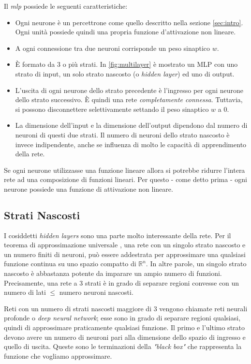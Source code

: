 Il \emph{mlp} possiede le seguenti caratteristiche: 
\begin{itemize}
\item Ogni neurone è un percettrone come quello descritto nella sezione \ref{sec:intro}. Ogni unità possiede quindi una propria funzione d'attivazione non lineare.
\item A ogni connessione tra due neuroni corrisponde un peso sinaptico $w$.
\item È formato da 3 o più strati. In \ref{fig:multilayer} è mostrato un MLP con uno strato di input, un solo strato nascosto (o \emph{hidden layer}) ed uno di output.
\item L'uscita di ogni neurone dello strato precedente è l'ingresso per ogni neurone dello
strato successivo. È quindi una rete \emph{completamente connessa}. Tuttavia, si possono
disconnettere selettivamente settando il peso sinaptico $w$ a 0.
\item La dimensione dell'input e la dimensione dell'output dipendono dal numero di
neuroni di questi due strati. Il numero di neuroni dello strato nascosto è invece
indipendente, anche se influenza di molto le capacità di apprendimento della rete. 
\end{itemize}
Se ogni neurone utilizzasse una funzione lineare allora si potrebbe ridurre l'intera rete ad una composizione di funzioni lineari. Per questo - come detto prima - ogni neurone possiede una funzione di attivazione non lineare. 

\subsection{Strati Nascosti}
I cosiddetti \emph{hidden layers} sono una parte molto interessante della rete. Per il teorema di
approssimazione universale \parencite{WApprox}, una rete con un singolo strato nascosto e un numero finiti di
neuroni, può essere addestrata per approssimare una qualsiasi funzione continua su uno spazio compatto di $\mathbb{R}^n$. In altre parole, un singolo strato nascosto è abbastanza potente da imparare un ampio numero di funzioni. Precisamente, una rete a 3 strati è in grado di separare regioni convesse con un numero di lati $\leqslant$ numero neuroni nascosti. 

Reti con un numero di strati nascosti maggiore di 3 vengono chiamate reti neurali profonde o \emph{deep neural network}; esse sono in grado di separare regioni qualsiasi, quindi di approssimare praticamente qualsiasi funzione. Il primo e l’ultimo strato devono avere un numero di neuroni pari alla dimensione dello spazio di ingresso e quello di uscita. Queste sono le terminazioni della \emph{"black box"} che rappresenta la funzione che vogliamo approssimare. 

